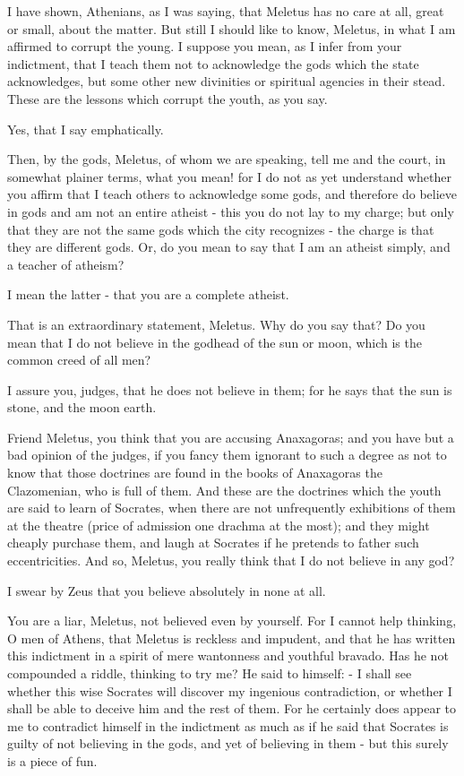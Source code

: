 I have shown, Athenians, as I was saying, that Meletus has no care
at all, great or small, about the matter. But still I should like
to know, Meletus, in what I am affirmed to corrupt the young. I suppose
you mean, as I infer from your indictment, that I teach them not to
acknowledge the gods which the state acknowledges, but some other
new divinities or spiritual agencies in their stead. These are the
lessons which corrupt the youth, as you say. 

Yes, that I say emphatically. 

Then, by the gods, Meletus, of whom we are speaking, tell me and the
court, in somewhat plainer terms, what you mean! for I do not as yet
understand whether you affirm that I teach others to acknowledge some
gods, and therefore do believe in gods and am not an entire atheist
- this you do not lay to my charge; but only that they are not the
same gods which the city recognizes - the charge is that they are
different gods. Or, do you mean to say that I am an atheist simply,
and a teacher of atheism? 

I mean the latter - that you are a complete atheist. 

That is an extraordinary statement, Meletus. Why do you say that?
Do you mean that I do not believe in the godhead of the sun or moon,
which is the common creed of all men? 

I assure you, judges, that he does not believe in them; for he says
that the sun is stone, and the moon earth. 

Friend Meletus, you think that you are accusing Anaxagoras; and you
have but a bad opinion of the judges, if you fancy them ignorant to
such a degree as not to know that those doctrines are found in the
books of Anaxagoras the Clazomenian, who is full of them. And these
are the doctrines which the youth are said to learn of Socrates, when
there are not unfrequently exhibitions of them at the theatre (price
of admission one drachma at the most); and they might cheaply purchase
them, and laugh at Socrates if he pretends to father such eccentricities.
And so, Meletus, you really think that I do not believe in any god?

I swear by Zeus that you believe absolutely in none at all.

You are a liar, Meletus, not believed even by yourself. For I cannot
help thinking, O men of Athens, that Meletus is reckless and impudent,
and that he has written this indictment in a spirit of mere wantonness
and youthful bravado. Has he not compounded a riddle, thinking to
try me? He said to himself: - I shall see whether this wise Socrates
will discover my ingenious contradiction, or whether I shall be able
to deceive him and the rest of them. For he certainly does appear
to me to contradict himself in the indictment as much as if he said
that Socrates is guilty of not believing in the gods, and yet of believing
in them - but this surely is a piece of fun. 

